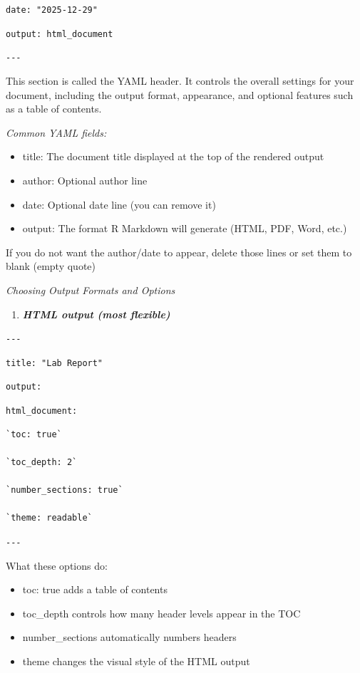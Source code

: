 \documentclass[
  11pt,
]{article}
\providecommand{\tightlist}{%
  \setlength{\itemsep}{0pt}\setlength{\parskip}{0pt}}
\begin{document}
\texttt{date:\ "2025-12-29"}

\texttt{output:\ html\_document}

\texttt{-\/-\/-}

This section is called the YAML header. It controls the overall settings
for your document, including the output format, appearance, and optional
features such as a table of contents.

\emph{Common YAML fields:}

\begin{itemize}
\tightlist
\item
  title: The document title displayed at the top of the rendered output
\item
  author: Optional author line
\item
  date: Optional date line (you can remove it)
\item
  output: The format R Markdown will generate (HTML, PDF, Word, etc.)
\end{itemize}

If you do not want the author/date to appear, delete those lines or set
them to blank (empty quote)

\emph{Choosing Output Formats and Options}

\begin{enumerate}
\def\labelenumi{\arabic{enumi}.}
\tightlist
\item
  \textbf{\emph{HTML output (most flexible)}}
\end{enumerate}

\texttt{-\/-\/-}

\texttt{title:\ "Lab\ Report"}

\texttt{output:}

\texttt{html\_document:}

\begin{verbatim}
`toc: true`

`toc_depth: 2`

`number_sections: true`

`theme: readable`
\end{verbatim}

\texttt{-\/-\/-}

What these options do:

\begin{itemize}
\tightlist
\item
  toc: true adds a table of contents
\item
  toc\_depth controls how many header levels appear in the TOC
\item
  number\_sections automatically numbers headers
\item
  theme changes the visual style of the HTML output
\end{itemize}
\end{document}
